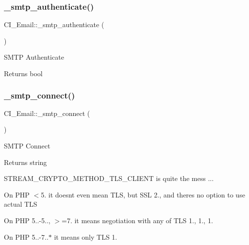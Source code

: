 \subsubsection{\texorpdfstring{\+\_\+smtp\+\_\+authenticate()}{\_smtp\_authenticate()}}
{\footnotesize\ttfamily C\+I\+\_\+\+Email\+::\+\_\+smtp\+\_\+authenticate (\begin{DoxyParamCaption}{ }\end{DoxyParamCaption})\hspace{0.3cm}{\ttfamily [protected]}}

S\+M\+TP Authenticate

\begin{DoxyReturn}{Returns}
bool 
\end{DoxyReturn}
\mbox{\label{class_c_i___email_a4a0be45e5ab10e8a9084f2338fdf4a4f}} 
\subsubsection{\texorpdfstring{\+\_\+smtp\+\_\+connect()}{\_smtp\_connect()}}
{\footnotesize\ttfamily C\+I\+\_\+\+Email\+::\+\_\+smtp\+\_\+connect (\begin{DoxyParamCaption}{ }\end{DoxyParamCaption})\hspace{0.3cm}{\ttfamily [protected]}}

S\+M\+TP Connect

\begin{DoxyReturn}{Returns}
string 
\end{DoxyReturn}
S\+T\+R\+E\+A\+M\+\_\+\+C\+R\+Y\+P\+T\+O\+\_\+\+M\+E\+T\+H\+O\+D\+\_\+\+T\+L\+S\+\_\+\+C\+L\+I\+E\+NT is quite the mess ...


\begin{DoxyItemize}
\item On P\+HP $<$5. it doesn\textquotesingle{}t even mean T\+LS, but S\+SL 2., and there\textquotesingle{}s no option to use actual T\+LS
\item On P\+HP 5..-\/5.., $>$=7. it means negotiation with any of T\+LS 1., 1., 1.
\item On P\+HP 5..-\/7..$\ast$ it means only T\+LS 1.
\end{DoxyItemize}

